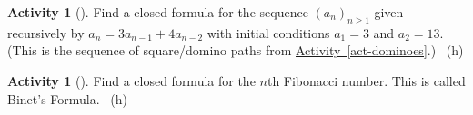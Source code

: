 \documentclass[10pt,]{book}
\theoremstyle{plain}
\theoremstyle{definition}
\theoremstyle{definition}
\theoremstyle{definition}
\newtheorem{activity}[project]{Activity}
\numberwithin{equation}{chapter}
\begin{document}
\begin{activity}[]\label{activity-142}
\hypertarget{p-953}{}%
Find a closed formula for the sequence \((a_n)_{n \ge 1}\) given recursively by \(a_n = 3a_{n-1} + 4a_{n-2}\) with initial conditions \(a_1 = 3\) and \(a_2 = 13\).  (This is the sequence of square/domino paths from \hyperref[act-dominoes]{Activity~\ref{act-dominoes}}.)%
~{\tiny (h)}\end{activity}
\begin{activity}[]\label{act-binet}
\hypertarget{p-955}{}%
Find a closed formula for the \(n\)th Fibonacci number.  This is called Binet's Formula.%
~{\tiny (h)}\end{activity}
\typeout{************************************************}
\typeout{************************************************}
\end{document}
